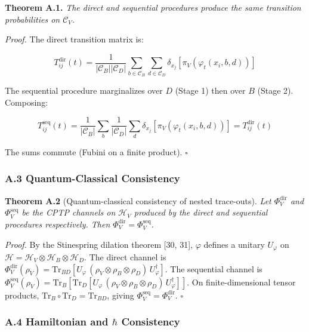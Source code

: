 \documentclass[
]{article}
\begin{document}
\textbf{Theorem A.1.} \emph{The direct and sequential procedures produce
the same transition probabilities on \(\mathcal{C}_V\).}

\emph{Proof.} The direct transition matrix is:

\[T^{\text{dir}}_{ij}(t) = \frac{1}{|\mathcal{C}_B||\mathcal{C}_D|} \sum_{b \in \mathcal{C}_B} \sum_{d \in \mathcal{C}_D} \delta_{x_j}[\pi_V(\varphi_t(x_i, b, d))]\]

The sequential procedure marginalizes over \(D\) (Stage 1) then over
\(B\) (Stage 2). Composing:

\[T^{\text{seq}}_{ij}(t) = \frac{1}{|\mathcal{C}_B|} \sum_b \frac{1}{|\mathcal{C}_D|} \sum_d \delta_{x_j}[\pi_V(\varphi_t(x_i, b, d))] = T^{\text{dir}}_{ij}(t)\]

The sums commute (Fubini on a finite product). \(\square\)

\hypertarget{a.3-quantum-classical-consistency}{%
\subsubsection{A.3 Quantum-Classical
Consistency}\label{a.3-quantum-classical-consistency}}

\textbf{Theorem A.2} (Quantum-classical consistency of nested
trace-outs). \emph{Let \(\Phi_V^{\text{dir}}\) and
\(\Phi_V^{\text{seq}}\) be the CPTP channels on \(\mathcal{H}_V\)
produced by the direct and sequential procedures respectively. Then
\(\Phi_V^{\text{dir}} = \Phi_V^{\text{seq}}\).}

\emph{Proof.} By the Stinespring dilation theorem {[}30, 31{]},
\(\varphi\) defines a unitary \(U_\varphi\) on
\(\mathcal{H} = \mathcal{H}_V \otimes \mathcal{H}_B \otimes \mathcal{H}_D\).
The direct channel is
\(\Phi_V^{\text{dir}}(\rho_V) = \text{Tr}_{BD}[U_\varphi\,(\rho_V \otimes \rho_B \otimes \rho_D)\,U_\varphi^\dagger]\).
The sequential channel is
\(\Phi_V^{\text{seq}}(\rho_V) = \text{Tr}_B[\text{Tr}_D[U_\varphi\,(\rho_V \otimes \rho_B \otimes \rho_D)\,U_\varphi^\dagger]]\).
On finite-dimensional tensor products,
\(\text{Tr}_B \circ \text{Tr}_D = \text{Tr}_{BD}\), giving
\(\Phi_V^{\text{seq}} = \Phi_V^{\text{dir}}\). \(\square\)

\hypertarget{a.4-hamiltonian-and-hbar-consistency}{%
\subsubsection{\texorpdfstring{A.4 Hamiltonian and \(\hbar\)
Consistency}{A.4 Hamiltonian and \textbackslash hbar Consistency}}\label{a.4-hamiltonian-and-hbar-consistency}}
\end{document}
